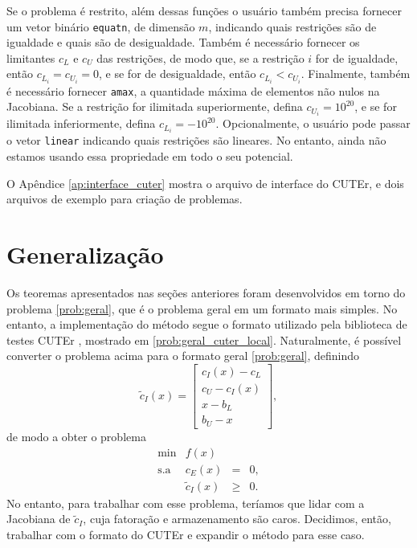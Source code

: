 Se o problema é restrito, além dessas funções o usuário também precisa fornecer
um vetor binário \verb+equatn+, de dimensão $m$, indicando quais restrições são
de igualdade e quais são de desigualdade. Também é necessário fornecer os
limitantes $c_L$ e $c_U$ das restrições, de modo que, se a restrição $i$ for de
igualdade, então $c_{L_i} = c_{U_i} = 0$, e se for de desigualdade, então
$c_{L_i} < c_{U_i}$.
Finalmente, também é necessário fornecer \verb+amax+, a quantidade máxima de
elementos não nulos na Jacobiana.
Se a restrição for ilimitada superiormente, defina $c_{U_i}
= 10^{20}$, e se for ilimitada inferiormente, defina $c_{L_i} = -10^{20}$.
Opcionalmente, o usuário pode passar o vetor \verb+linear+ indicando quais
restrições são lineares. No entanto, ainda não estamos usando essa propriedade em
todo o seu potencial.

O Apêndice \ref{ap:interface_cuter} mostra o arquivo de interface do CUTEr, e dois
arquivos de exemplo para criação de problemas.

\section{Generalização}

Os teoremas apresentados nas seções anteriores foram desenvolvidos em torno do
problema \eqref{prob:geral}, que é o problema geral em um formato mais simples.
No entanto, a implementação do método segue o formato utilizado pela biblioteca
de testes CUTEr \cite{bib:cuter}, mostrado em \eqref{prob:geral_cuter_local}.
Naturalmente, é possível converter o problema acima para o formato geral
\eqref{prob:geral}, definindo 
$$\tilde{c}_I(x) =
\left[
\begin{array}{c}
c_I(x) - c_L \\
c_U - c_I(x) \\
x - b_L \\
b_U - x
\end{array}\right],
$$
de modo a obter o problema
\begin{equation}\nonumber
\begin{array}{rrcl}
 \min      & f(x) \\
\mbox{s.a} & c_E(x) & = & 0, \\
& \tilde{c}_I(x) & \geq & 0.
\end{array}
\end{equation}
No entanto, para trabalhar com esse problema, teríamos que lidar com a Jacobiana
de $\tilde{c}_I$, cuja fatoração e armazenamento são caros.
Decidimos, então, trabalhar com o formato do CUTEr e expandir o método para esse
caso.

